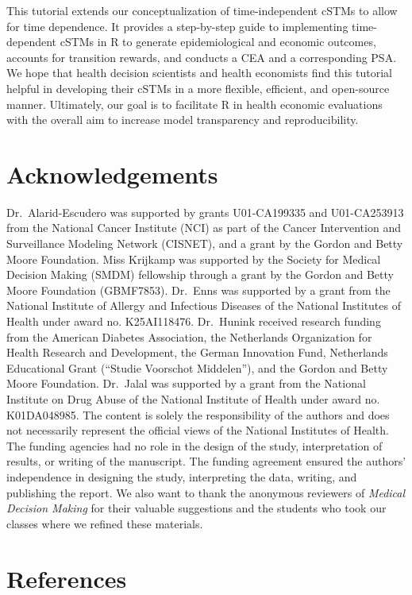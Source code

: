 \documentclass[
]{article}
\begin{document}
This tutorial extends our conceptualization of time-independent cSTMs to allow for time dependence. It provides a step-by-step guide to implementing time-dependent cSTMs in R to generate epidemiological and economic outcomes, accounts for transition rewards, and conducts a CEA and a corresponding PSA. We hope that health decision scientists and health economists find this tutorial helpful in developing their cSTMs in a more flexible, efficient, and open-source manner. Ultimately, our goal is to facilitate R in health economic evaluations with the overall aim to increase model transparency and reproducibility.

\hypertarget{acknowledgements}{%
\section{Acknowledgements}\label{acknowledgements}}

Dr.~Alarid-Escudero was supported by grants U01-CA199335 and U01-CA253913 from the National Cancer Institute (NCI) as part of the Cancer Intervention and Surveillance Modeling Network (CISNET), and a grant by the Gordon and Betty Moore Foundation. Miss Krijkamp was supported by the Society for Medical Decision Making (SMDM) fellowship through a grant by the Gordon and Betty Moore Foundation (GBMF7853). Dr.~Enns was supported by a grant from the National Institute of Allergy and Infectious Diseases of the National Institutes of Health under award no. K25AI118476. Dr.~Hunink received research funding from the American Diabetes Association, the Netherlands Organization for Health Research and Development, the German Innovation Fund, Netherlands Educational Grant (``Studie Voorschot Middelen''), and the Gordon and Betty Moore Foundation. Dr.~Jalal was supported by a grant from the National Institute on Drug Abuse of the National Institute of Health under award no. K01DA048985. The content is solely the responsibility of the authors and does not necessarily represent the official views of the National Institutes of Health. The funding agencies had no role in the design of the study, interpretation of results, or writing of the manuscript. The funding agreement ensured the authors' independence in designing the study, interpreting the data, writing, and publishing the report. We also want to thank the anonymous reviewers of \emph{Medical Decision Making} for their valuable suggestions and the students who took our classes where we refined these materials.

\hypertarget{references}{%
\section*{References}\label{references}}
\end{document}
